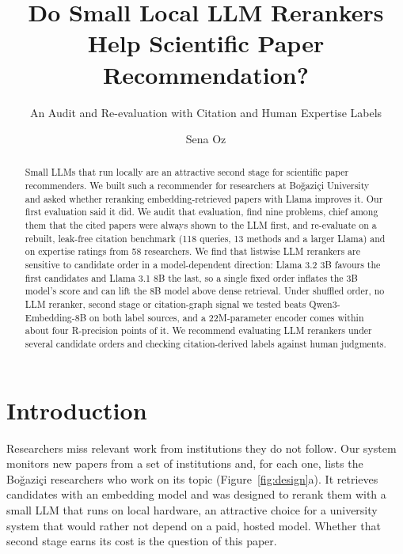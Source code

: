 \documentclass[sigconf,nonacm]{acmart}
\begin{document}
\title{Do Small Local LLM Rerankers Help Scientific Paper Recommendation?}
\subtitle{An Audit and Re-evaluation with Citation and Human Expertise Labels}

\author{Sena Oz}

\begin{abstract}
Small LLMs that run locally are an attractive second stage for scientific paper recommenders. We built such a recommender for researchers at Boğaziçi University and asked whether reranking embedding-retrieved papers with Llama improves it. Our first evaluation said it did. We audit that evaluation, find nine problems, chief among them that the cited papers were always shown to the LLM first, and re-evaluate on a rebuilt, leak-free citation benchmark (118 queries, 13 methods and a larger Llama) and on expertise ratings from 58 researchers. We find that listwise LLM rerankers are sensitive to candidate order in a model-dependent direction: Llama 3.2 3B favours the first candidates and Llama 3.1 8B the last, so a single fixed order inflates the 3B model's score and can lift the 8B model above dense retrieval. Under shuffled order, no LLM reranker, second stage or citation-graph signal we tested beats Qwen3-Embedding-8B on both label sources, and a 22M-parameter encoder comes within about four R-precision points of it. We recommend evaluating LLM rerankers under several candidate orders and checking citation-derived labels against human judgments.
\end{abstract}


\maketitle

\section{Introduction}
\label{sec:intro}
Researchers miss relevant work from institutions they do not follow.
Our system monitors new papers from a set of institutions and, for each one, lists the Boğaziçi researchers who work on its topic (Figure~\ref{fig:design}a).
It retrieves candidates with an embedding model and was designed to rerank them with a small LLM that runs on local hardware, an attractive choice for a university system that would rather not depend on a paid, hosted model.
Whether that second stage earns its cost is the question of this paper.
\end{document}
